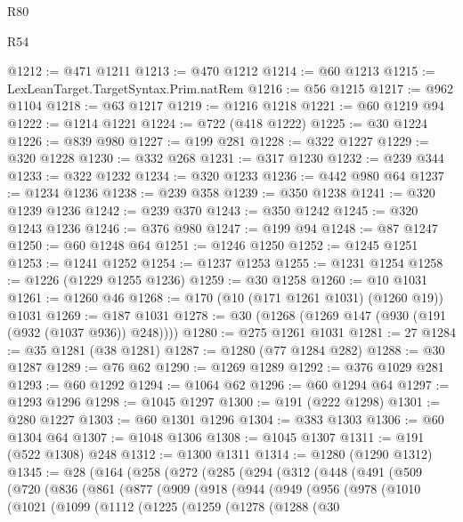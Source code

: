 \begin{lexlean}{R80}
\begin{lexlean}{R54}
\begin{coremodule}
{{{{{{{{{{{{{{{{{{{{{{{{{{{{{{{{{{{{{{{{{{{{{{{{{{@1212 := @471 @1211
@1213 := @470 @1212
@1214 := @60 @1213
@1215 := LexLeanTarget.TargetSyntax.Prim.natRem
@1216 := @56 @1215
@1217 := @962 @1104
@1218 := @63 @1217
@1219 := @1216 @1218
@1221 := @60 @1219 @94
@1222 := @1214 @1221
@1224 := @722 (@418 @1222)
@1225 := @30 @1224
@1226 := @839 @980
@1227 := @199 @281
@1228 := @322 @1227
@1229 := @320 @1228
@1230 := @332 @268
@1231 := @317 @1230
@1232 := @239 @344
@1233 := @322 @1232
@1234 := @320 @1233
@1236 := @442 @980 @64
@1237 := @1234 @1236
@1238 := @239 @358
@1239 := @350 @1238
@1241 := @320 @1239 @1236
@1242 := @239 @370
@1243 := @350 @1242
@1245 := @320 @1243 @1236
@1246 := @376 @980
@1247 := @199 @94
@1248 := @87 @1247
@1250 := @60 @1248 @64
@1251 := @1246 @1250
@1252 := @1245 @1251
@1253 := @1241 @1252
@1254 := @1237 @1253
@1255 := @1231 @1254
@1258 := @1226 (@1229 @1255 @1236)
@1259 := @30 @1258
@1260 := @10 @1031
@1261 := @1260 @46
@1268 := @170 (@10 (@171 @1261 @1031) (@1260 @19)) @1031
@1269 := @187 @1031
@1278 := @30 (@1268 (@1269 @147 (@930 (@191 (@932 (@1037 @936)) @248))))
@1280 := @275 @1261 @1031
@1281 := 27
@1284 := @35 @1281 (@38 @1281)
@1287 := @1280 (@77 @1284 @282)
@1288 := @30 @1287
@1289 := @76 @62
@1290 := @1269 @1289
@1292 := @376 @1029 @281
@1293 := @60 @1292
@1294 := @1064 @62
@1296 := @60 @1294 @64
@1297 := @1293 @1296
@1298 := @1045 @1297
@1300 := @191 (@222 @1298)
@1301 := @280 @1227
@1303 := @60 @1301 @1296
@1304 := @383 @1303
@1306 := @60 @1304 @64
@1307 := @1048 @1306
@1308 := @1045 @1307
@1311 := @191 (@522 @1308) @248
@1312 := @1300 @1311
@1314 := @1280 (@1290 @1312)
@1345 := @28
    (@164
      (@258
        (@272
          (@285
            (@294
              (@312
                (@448
                  (@491
                    (@509
                      (@720
                        (@836
                          (@861
                            (@877
                              (@909
                                (@918
                                  (@944
                                    (@949
                                      (@956
                                        (@978
                                          (@1010
                                            (@1021
                                              (@1099
                                                (@1112
                                                  (@1225
                                                    (@1259
                                                      (@1278
                                                        (@1288
                                                          (@30
}}}}}}}}}}}}}}}}}}}}}}}}}}}}}}}}}}}}}}}}}}}}}}}}}}
\end{coremodule}
\end{lexlean}
\end{lexlean}

